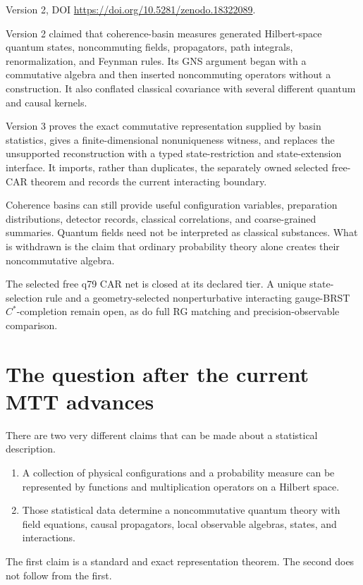 \documentclass[11pt]{article}
\begin{document}
\begin{description}[style=nextline]
\item[Supersedes.]
Version 2, DOI \url{https://doi.org/10.5281/zenodo.18322089}.
\item[Reason.]
Version 2 claimed that coherence-basin measures generated Hilbert-space
quantum states, noncommuting fields, propagators, path integrals,
renormalization, and Feynman rules.  Its GNS argument began with a
commutative algebra and then inserted noncommuting operators without a
construction.  It also conflated classical covariance with several
different quantum and causal kernels.
\item[Resolution.]
Version 3 proves the exact commutative representation supplied by basin
statistics, gives a finite-dimensional nonuniqueness witness, and replaces
the unsupported reconstruction with a typed state-restriction and
state-extension interface.  It imports, rather than duplicates, the
separately owned selected free-CAR theorem and records the current
interacting boundary.
\item[Retained content.]
Coherence basins can still provide useful configuration variables,
preparation distributions, detector records, classical correlations, and
coarse-grained summaries.  Quantum fields need not be interpreted as
classical substances.  What is withdrawn is the claim that ordinary
probability theory alone creates their noncommutative algebra.
\item[Open boundary.]
The selected free q79 CAR net is closed at its declared tier.  A unique
state-selection rule and a geometry-selected nonperturbative interacting
gauge-BRST \(C^*\)-completion remain open, as do full RG matching and
precision-observable comparison.
\end{description}

\tableofcontents

\section{The question after the current MTT advances}

There are two very different claims that can be made about a statistical
description.
\begin{enumerate}
\item A collection of physical configurations and a probability measure
can be represented by functions and multiplication operators on a Hilbert
space.
\item Those statistical data determine a noncommutative quantum theory with
field equations, causal propagators, local observable algebras, states, and
interactions.
\end{enumerate}
The first claim is a standard and exact representation theorem.  The second
does not follow from the first.
\end{document}
